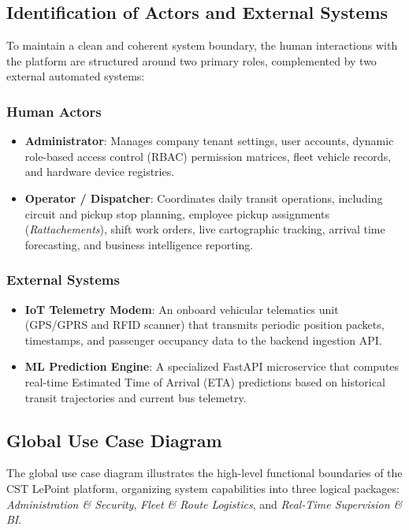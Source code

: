 \subsection{Identification of Actors and External Systems}

To maintain a clean and coherent system boundary, the human interactions with the platform are structured around two primary roles, complemented by two external automated systems:

\subsubsection{Human Actors}
\begin{itemize}
  \item \textbf{Administrator}: Manages company tenant settings, user accounts, dynamic role-based access control (RBAC) permission matrices, fleet vehicle records, and hardware device registries.
  \item \textbf{Operator / Dispatcher}: Coordinates daily transit operations, including circuit and pickup stop planning, employee pickup assignments (\emph{Rattachements}), shift work orders, live cartographic tracking, arrival time forecasting, and business intelligence reporting.
\end{itemize}

\subsubsection{External Systems}
\begin{itemize}
  \item \textbf{IoT Telemetry Modem}: An onboard vehicular telematics unit (GPS/GPRS and RFID scanner) that transmits periodic position packets, timestamps, and passenger occupancy data to the backend ingestion API.
  \item \textbf{ML Prediction Engine}: A specialized FastAPI microservice that computes real-time Estimated Time of Arrival (ETA) predictions based on historical transit trajectories and current bus telemetry.
\end{itemize}

\subsection{Global Use Case Diagram}

The global use case diagram illustrates the high-level functional boundaries of the CST LePoint platform, organizing system capabilities into three logical packages: \emph{Administration \& Security}, \emph{Fleet \& Route Logistics}, and \emph{Real-Time Supervision \& BI}.

